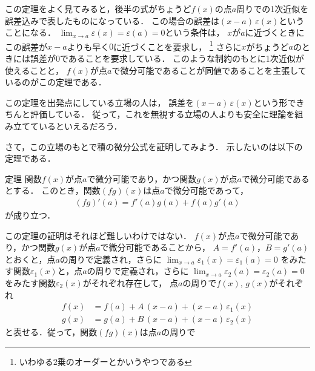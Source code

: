 この定理をよく見てみると，後半の式がちょうど$f(x)$の点$a$周りでの1次近似を誤差込みで表したものになっている．
この場合の誤差は$(x-a) \, \varepsilon (x)$ということになる．
$\displaystyle \lim_{x \to a}\varepsilon (x) = \varepsilon (a) = 0$という条件は，
$x$が$a$に近づくときにこの誤差が$x-a$よりも早く$0$に近づくことを要求し，
\footnote{いわゆる2乗のオーダーとかいうやつである}
さらに$x$がちょうど$a$のときには誤差が0であることを要求している．
このような制約のもとに1次近似が使えることと，
$f(x)$が点$a$で微分可能であることが同値であることを主張しているのがこの定理である．

この定理を出発点にしている立場の人は，
誤差を$(x-a) \, \varepsilon(x)$という形できちんと評価している．
従って，これを無視する立場の人よりも安全に理論を組み立てているといえるだろう．

さて，この立場のもとで積の微分公式を証明してみよう．
示したいのは以下の定理である．
\begin{itembox}[l]{定理}
関数$f(x)$が点$a$で微分可能であり，かつ関数$g(x)$が点$a$で微分可能であるとする．
このとき，関数$(fg)(x)$は点$a$で微分可能であって，
\begin{align*}
(fg)' (a) = f'(a)g(a) + f(a) g'(a)
\end{align*}
が成り立つ．
\end{itembox}
この定理の証明はそれほど難しいわけではない．
$f(x)$が点$a$で微分可能であり，かつ関数$g(x)$が点$a$で微分可能であることから，
$A=f'(a)$，$B=g'(a)$とおくと，点$a$の周りで定義され，さらに
$\displaystyle \lim_{x \to a} \varepsilon_1(x)=\varepsilon_1(a)=0$
をみたす関数$\varepsilon_1(x)$と，点$a$の周りで定義され，さらに
$\displaystyle \lim_{x \to a} \varepsilon_2(a)=\varepsilon_2(a)=0$
をみたす関数$\varepsilon_2(x)$がそれぞれ存在して，
点$a$の周りで$f(x), \, g(x)$がそれぞれ
\begin{align*}
f(x) & = f(a) + A \, (x-a) + (x-a) \, \varepsilon_1(x) \\
g(x) & = g(a) + B \, (x-a) + (x-a) \, \varepsilon_2(x)
\end{align*}
と表せる．従って，関数$(fg)(x)$は点$a$の周りで
